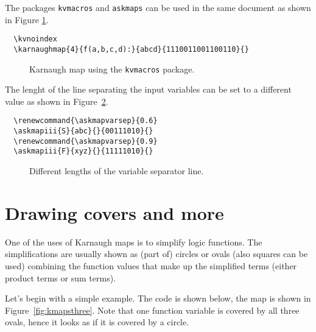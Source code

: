 \documentclass[a4paper,10pt]{ltxdoc}
\newcommand\Package[1]{\texttt{#1}}
\begin{document}
The packages \Package{kvmacros} and \Package{askmaps} can be used in the same
document as shown in Figure \ref{fig:karnaughmapnoindex}.
\begin{verbatim}
  \kvnoindex
  \karnaughmap{4}{f(a,b,c,d):}{abcd}{1110011001100110}{}
\end{verbatim}
\begin{figure}[H]
\centering
  \kvnoindex
\caption{Karnaugh map using the \Package{kvmacros} package.}
\label{fig:karnaughmapnoindex}
\end{figure}

The lenght of the line separating the input variables can be set to a
different value as shown in Figure~\ref{fig:difflenvarsep}.

\begin{verbatim}
  \renewcommand{\askmapvarsep}{0.6}
  \askmapiii{S}{abc}{}{00111010}{}
  \renewcommand{\askmapvarsep}{0.9}
  \askmapiii{F}{xyz}{}{11111010}{}
\end{verbatim}
\begin{figure}[H]
\centering
\renewcommand{\askmapvarsep}{0.6}
\renewcommand{\askmapvarsep}{0.9}
\caption{Different lengths of the variable separator line.}
\label{fig:difflenvarsep}
\end{figure}



\section{Drawing covers and more}
\label{sec:drawing}
One of the uses of Karnaugh maps is to simplify logic functions. The
simplifications are usually shown as (part of) circles or ovals (also squares can be used) combining
the function values that make up the simplified terms (either product terms
or sum terms).%

Let's begin with a simple example. The code is shown below, the map is
shown in Figure~\ref{fig:kmapsthree}. Note that one function variable is
covered by all three ovals, hence it looks as if it is covered by a circle.
\end{document}

